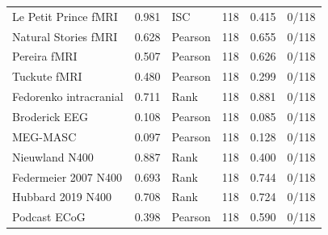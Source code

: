 {\begin{longtable}{@{}lrlrrr@{}}
Le Petit Prince fMRI & 0.981 & ISC & 118 & 0.415 & 0/118 \\
Natural Stories fMRI & 0.628 & Pearson & 118 & 0.655 & 0/118 \\
Pereira fMRI & 0.507 & Pearson & 118 & 0.626 & 0/118 \\
Tuckute fMRI & 0.480 & Pearson & 118 & 0.299 & 0/118 \\
Fedorenko intracranial & 0.711 & Rank & 118 & 0.881 & 0/118 \\
Broderick EEG & 0.108 & Pearson & 118 & 0.085 & 0/118 \\
MEG-MASC & 0.097 & Pearson & 118 & 0.128 & 0/118 \\
Nieuwland N400 & 0.887 & Rank & 118 & 0.400 & 0/118 \\
Federmeier 2007 N400 & 0.693 & Rank & 118 & 0.744 & 0/118 \\
Hubbard 2019 N400 & 0.708 & Rank & 118 & 0.724 & 0/118 \\
Podcast ECoG & 0.398 & Pearson & 118 & 0.590 & 0/118 \\
\end{longtable}
}
